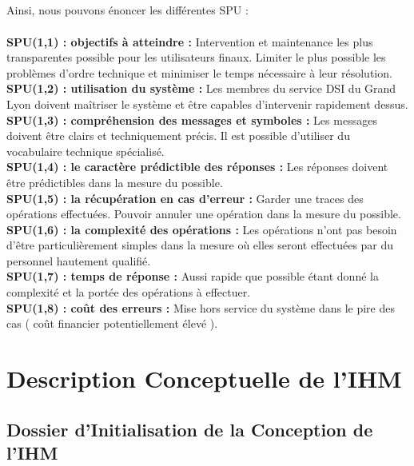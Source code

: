 \documentclass{report}
\begin{document}
\paragraph{}
Ainsi, nous pouvons énoncer les différentes SPU : \\
~~\\
\textbf{SPU(1,1) : objectifs à atteindre :}
	Intervention et maintenance les plus transparentes possible pour les utilisateurs finaux. Limiter le plus possible les problèmes d’ordre technique et minimiser le temps nécessaire à leur résolution.\\
\textbf{SPU(1,2) : utilisation du système :}
	Les membres du service DSI du Grand Lyon doivent maîtriser le système et être capables d’intervenir rapidement dessus.\\
\textbf{SPU(1,3) : compréhension des messages et symboles :}
	Les messages doivent être clairs et techniquement précis. Il est possible d’utiliser du vocabulaire technique spécialisé.\\
\textbf{SPU(1,4) : le caractère prédictible des réponses :}
	Les réponses doivent être prédictibles dans la mesure du possible.\\
\textbf{SPU(1,5) : la récupération en cas d’erreur :}
	Garder une traces des opérations effectuées. Pouvoir annuler une opération dans la mesure du possible.\\ 
\textbf{SPU(1,6) : la complexité des opérations :}
	Les opérations n’ont pas besoin d’être particulièrement simples dans la mesure où elles seront effectuées par du personnel hautement qualifié.\\
\textbf{SPU(1,7) : temps de réponse :}
	Aussi rapide que possible étant donné la complexité et la portée des opérations à effectuer.\\
\textbf{SPU(1,8) :  coût des erreurs :}
	Mise hors service du système dans le pire des cas ( coût financier potentiellement élevé ).\\





\chapter{Description Conceptuelle de l'IHM}


\section{Dossier d'Initialisation de la Conception de l'IHM}
\end{document}
